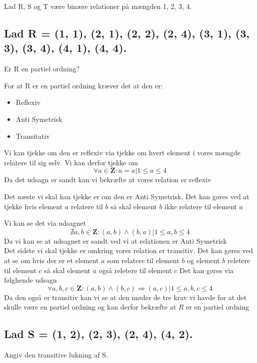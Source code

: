 Lad R, S og T være binære relationer på mængden {1, 2, 3, 4}.

\subsection{Lad R = {(1, 1), (2, 1), (2, 2), (2, 4), (3, 1), (3, 3), (3, 4), (4, 1), (4, 4)}.}

Er R en partiel ordning?
\newline

For at R er en partiel ordning kræver det at den er:
    \begin{itemize}  
         \item Reflexiv
         \item Anti Symetrisk
         \item Transitativ
    \end{itemize}

Vi kan tjekke om den er reflexiv via tjekke om hvert element i vores mængde relatere til sig selv.
Vi kan derfor tjekke om 
\[\forall a \in \textbf{Z} : a = a | 1 \leq a \leq 4\]
Da det udsagn er sandt kan vi bekræfte at vores relation er reflexiv\newline
    
Det næste vi skal kan tjekke er om den er Anti Symetrisk. Det kan gøres ved at tjekke hvis element $a$ relatere til $b$ så skal element $b$ ikke relatere til element $a$

Vi kan se det via udsagnet
\[\nexists a,b \in \textbf{Z} : (a,b) \wedge (b,a) | 1 \leq a,b \leq 4\]
Da vi kan se at udsagnet er sandt ved vi at relationen er Anti Symetrisk\\

Det sidste vi skal tjekke er omkring vores relation er transitiv. Det kan gøres ved at se om hvis der er et element $a$ som relatere til element $b$ og element $b$ reletere til element $c$ så skal element $a$ også reletere til element $c$
Det kan gøres via følghende udsagn
\[\forall a,b,c \in \textbf{Z} : (a,b) \wedge (b,c) \Rightarrow (a,c) | 1 \leq a,b,c \leq 4\]
Da den også er transitiv kan vi se at den møder de tre krav vi havde for at det skulle være en partiel ordning og kan derfor bekræfte at $R$ er en partiel ordning

\subsection{Lad S = {(1, 2), (2, 3), (2, 4), (4, 2)}.}

Angiv den transitive lukning af S.\\


